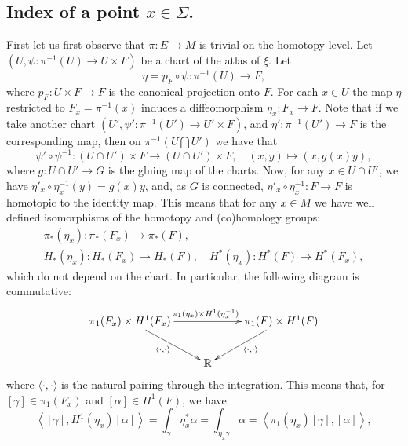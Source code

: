 \documentclass[12pt,letterpaper]{amsart}
\theoremstyle{definition}
\theoremstyle{plain}
\theoremstyle{remark}
\begin{document}
\subsection{Index of a point $x \in \Sigma$.}
\label{subsec:2_2}
First let us first observe that $\pi : E \to M$ is trivial on the homotopy level.
Let $(U, \psi: \pi^{-1}(U) \to U \times F)$ be a chart of the atlas of $\xi$.
Let
\begin{equation}
\eta = p_F \circ \psi: \pi^{-1}(U) \to F,
\label{eq:6}
\end{equation}
where $p_F : U \times F \to F$ is the canonical projection onto $F$.
For each $x \in U$ the map $\eta$ restricted to $F_x = \pi^{-1}(x)$ induces a diffeomorphism $\eta_x : F_x \to F$.
Note that
if we take another chart $(U', \psi': \pi^{-1}(U') \to U' \times F)$, and $\eta' : \pi^{-1}(U') \to F$ is the corresponding map, then on $\pi^{-1}(U \bigcap U')$ we have that
\begin{equation}
\psi' \circ \psi^{-1} : (U \cap U') \times F \to (U \cap U') \times F, \quad (x, y) \mapsto (x, g(x) y),
\label{eq:7}
\end{equation}
where $g : U \cap U' \to G$ is the gluing map of the charts.
Now, for any $x \in U \cap U'$, we have $\eta'_x \circ \eta_x^{-1} (y) = g(x) y$, and, as $G$ is connected, $\eta'_x \circ \eta_x^{-1} : F \to F$ is homotopic to the identity map.
This means that for any $x \in M$ we have well defined isomorphisms of the homotopy and (co)homology groups:
\begin{equation}
\begin{array}{l}
\pi_*(\eta_x) : \pi_*(F_x) \to \pi_*(F),
\\[5pt]
H_*(\eta_x) : H_*(F_x) \to H_*(F), \quad H^*(\eta_x) : H^*(F) \to H^*(F_x),
\end{array}
\label{eq:8}
\end{equation}
which do not depend on the chart.
In particular, the following diagram is commutative:
\begin{equation}
\xymatrix{\pi_1(F_x) \times H^1(F_x) \ar[dr]_{\langle \cdot, \cdot \rangle}\ar[rr]^{\pi_1(\eta_x)\times H^1(\eta_x^{-1})} & & \pi_1(F) \times H^1(F) \ar[dl]^{\langle \cdot, \cdot \rangle}
\\
&\mathbb{R} &
}
\label{eq:9}
\end{equation}
where
$\langle \cdot, \cdot \rangle$ is the natural pairing through the integration.
This means that, for $[\gamma] \in \pi_1(F_x)$ and $[\alpha] \in H^1(F)$, we have
\begin{equation}
\left\langle [\gamma], H^1(\eta_x)[\alpha] \right\rangle = \int_\gamma \eta_x^* \alpha = \int_{\eta_x \gamma} \alpha = \left\langle \pi_1(\eta_x)[\gamma], [\alpha] \right\rangle,
\label{eq:10}
\end{equation}
\end{document}
